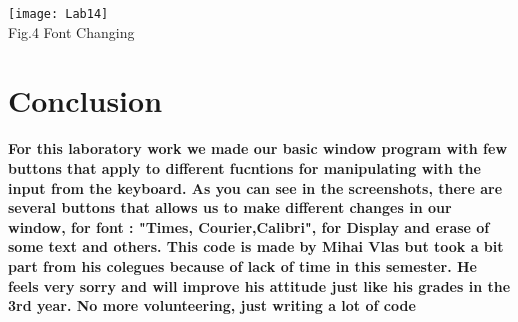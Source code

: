 \documentclass[12pt]{article}
\begin{document}
        \begin{minipage}[b]{1.0\linewidth}
      \begin{center}
        \texttt{[image: Lab14]}
         \\ Fig.4 Font Changing
      \end{center}
    \end{minipage}
\section{Conclusion}

\textbf{For this laboratory work we made our basic window program with few buttons that apply to different fucntions for manipulating with the input from the keyboard. As you can see in the screenshots, there are several buttons that allows us to make different changes in our window, for font : "Times, Courier,Calibri", for Display and erase of some text and others. This code is made by Mihai Vlas but took a bit part from his colegues because of lack of time in this semester. He feels very sorry and will improve his attitude just like his grades in the 3rd year. No more volunteering, just writing a lot of code }

  
\end{document}
